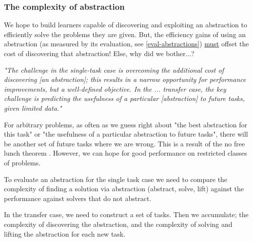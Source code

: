 %
%
%

\subsubsection{The complexity of abstraction}

We hope to build learners capable of discovering and exploiting an abstraction
to efficiently solve the problems they are given.
But, the efficiency gains of using an abstraction (as measured by its evaluation, see \ref{eval-abstractions}) \underline{must} offset the cost of
discovering that abstraction! Else, why did we bother...?

\begin{displayquote}
\textit{"The challenge in the single-task case is overcoming the additional cost of discovering [an abstraction];
this results in a narrow opportunity for performance improvements, but a well-defined objective.
In the ... transfer case, the key challenge is predicting the usefulness of a particular [abstraction] to future tasks, given limited data."}\cite{Konidaris2019}
\end{displayquote}

For arbitrary problems, as often as we guess right about "the best abstraction for this task" or "the usefulness of a particular abstraction to future tasks",
there will be another set of future tasks where we are wrong. This is a result of the no free lunch theorem \cite{Wolpert1996}. However, we can hope for good performance on restricted classes of problems.

To evaluate an abstraction for the single task case we need to compare the complexity of
finding a solution via abstraction (abstract, solve, lift) against the performance against
solvers that do not abstract.

In the transfer case, we need to construct a set of tasks. Then we accumulate; the
complexity of discovering the abstraction, and the complexity of solving
and lifting the abstraction for each new task.

